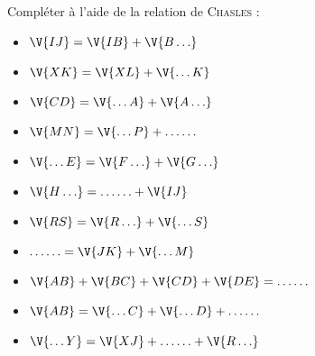 \begin{exo}
Compléter à l'aide de la relation de \textsc{Chasles} :
\vspace{-1em}\begin{multicols}{3}
\begin{itemize}
	\item $\V{IJ}=\V{IB}+\V{B\ldots}$
	\item $\V{XK}=\V{XL}+\V{\ldots K}$
	\item $\V{CD}=\V{\ldots A}+\V{A\ldots}$
	\item $\V{MN}=\V{\ldots P}+\ldots\ldots$
	\item $\V{\ldots E}=\V{F\ldots}+\V{G\ldots}$
	\item $\V{H\ldots}=\ldots\ldots+\V{IJ}$
	\item $\V{RS}=\V{R\ldots}+\V{\ldots S}$
	\item $\ldots\ldots=\V{JK}+\V{\ldots M}$
	\item $\V{AB}+\V{BC}+\V{CD}+\V{DE}=\ldots\ldots$
	\item $\V{AB}=\V{\ldots C}+\V{\ldots D}+\ldots\ldots$
	\item $\V{\ldots Y}=\V{XJ}+\ldots\ldots+\V{R\ldots}$
\end{itemize}
\end{multicols}
\end{exo}

